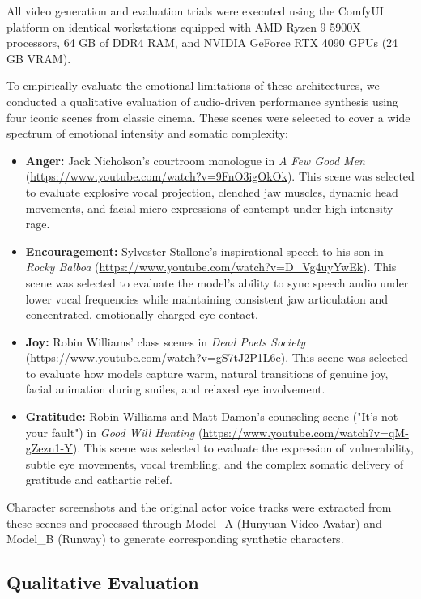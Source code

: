 \documentclass[pdflatex,sn-mathphys-num]{sn-jnl}
\newcommand{\emAnger}{Anger\xspace}
\newcommand{\emEncouragement}{Encouragement\xspace}
\newcommand{\emJoy}{Joy\xspace}
\newcommand{\emGratitude}{Gratitude\xspace}
\theoremstyle{thmstyleone}
\theoremstyle{thmstyletwo}
\theoremstyle{thmstylethree}
\begin{document}
All video generation and evaluation trials were executed using the ComfyUI platform on identical workstations equipped with AMD Ryzen 9 5900X processors, 64 GB of DDR4 RAM, and NVIDIA GeForce RTX 4090 GPUs (24 GB VRAM).

To empirically evaluate the emotional limitations of these architectures, we conducted a qualitative evaluation of audio-driven performance synthesis using four iconic scenes from classic cinema. These scenes were selected to cover a wide spectrum of emotional intensity and somatic complexity:

\begin{itemize}
    \item \textbf{\emAnger:} Jack Nicholson's courtroom monologue in \textit{A Few Good Men} (\url{https://www.youtube.com/watch?v=9FnO3igOkOk}). This scene was selected to evaluate explosive vocal projection, clenched jaw muscles, dynamic head movements, and facial micro-expressions of contempt under high-intensity rage.
    \item \textbf{\emEncouragement:} Sylvester Stallone's inspirational speech to his son in \textit{Rocky Balboa} (\url{https://www.youtube.com/watch?v=D_Vg4uyYwEk}). This scene was selected to evaluate the model's ability to sync speech audio under lower vocal frequencies while maintaining consistent jaw articulation and concentrated, emotionally charged eye contact.
    \item \textbf{\emJoy:} Robin Williams' class scenes in \textit{Dead Poets Society} (\url{https://www.youtube.com/watch?v=gS7tJ2P1L6c}). This scene was selected to evaluate how models capture warm, natural transitions of genuine joy, facial animation during smiles, and relaxed eye involvement.
    \item \textbf{\emGratitude:} Robin Williams and Matt Damon's counseling scene ("It's not your fault") in \textit{Good Will Hunting} (\url{https://www.youtube.com/watch?v=qM-gZezn1-Y}). This scene was selected to evaluate the expression of vulnerability, subtle eye movements, vocal trembling, and the complex somatic delivery of gratitude and cathartic relief.
\end{itemize}

Character screenshots and the original actor voice tracks were extracted from these scenes and processed through Model\_A (Hunyuan-Video-Avatar) and Model\_B (Runway) to generate corresponding synthetic characters.

\subsection{Qualitative Evaluation}\label{subsec:qualitative_evaluation}
\end{document}
